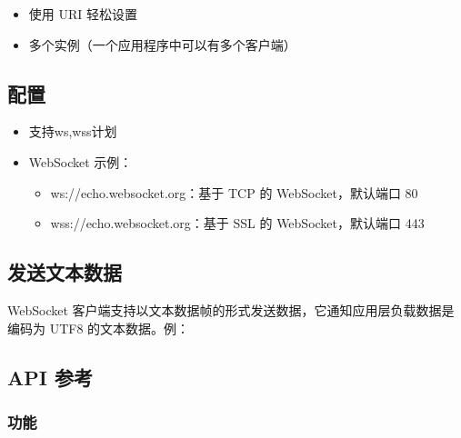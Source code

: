 \documentclass[a4paper,12pt,english]{sphinxmanual}
\begin{document}
{{\begin{itemize}
\item {} 
\sphinxAtStartPar
使用 URI 轻松设置

\item {} 
\sphinxAtStartPar
多个实例（一个应用程序中可以有多个客户端）

\end{itemize}


\subsection{配置}
\label{\detokenize{exp-esp32/websocket:id3}}\begin{itemize}
\item {} 
\sphinxAtStartPar
支持ws,wss计划

\item {} 
\sphinxAtStartPar
WebSocket 示例：
\begin{itemize}
\item {} 
\sphinxAtStartPar
ws://echo.websocket.org：基于 TCP 的 WebSocket，默认端口 80

\item {} 
\sphinxAtStartPar
wss://echo.websocket.org：基于 SSL 的 WebSocket，默认端口 443

\end{itemize}

\end{itemize}


\subsection{发送文本数据}
\label{\detokenize{exp-esp32/websocket:id4}}
\sphinxAtStartPar
WebSocket 客户端支持以文本数据帧的形式发送数据，它通知应用层负载数据是编码为 UTF\sphinxhyphen{}8 的文本数据。例：

\begin{sphinxVerbatim}[commandchars=\\\{\}]
\end{sphinxVerbatim}


\subsection{API 参考}
\label{\detokenize{exp-esp32/websocket:api}}

\subsubsection{功能}
\label{\detokenize{exp-esp32/websocket:id5}}
\begin{sphinxVerbatim}[commandchars=\\\{\}]
\end{sphinxVerbatim}

}}
\end{document}
